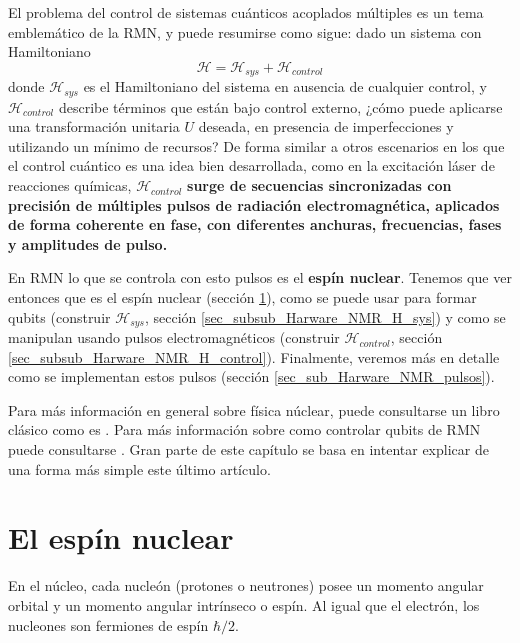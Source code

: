 El problema del control de sistemas cuánticos acoplados múltiples es un tema emblemático de la RMN, y puede resumirse como sigue: dado un sistema con Hamiltoniano
\begin{equation}
\mathcal{H} = \mathcal{H}_{sys} + \mathcal{H}_{control}
\end{equation}
donde $\mathcal{H}_{sys}$ es el Hamiltoniano del sistema en ausencia de cualquier control, y $\mathcal{H}_{control}$ describe términos que están bajo control externo, ¿cómo puede aplicarse una transformación unitaria $U$ deseada, en presencia de imperfecciones y utilizando un mínimo de recursos? De forma similar a otros escenarios en los que el control cuántico es una idea bien desarrollada, como en la excitación láser de reacciones químicas, $\mathcal{H}_{control}$ \textbf{surge de secuencias sincronizadas con precisión de múltiples pulsos de radiación electromagnética, aplicados de forma coherente en fase, con diferentes anchuras, frecuencias, fases y amplitudes de pulso.}

En RMN lo que se controla con esto pulsos es el \textbf{espín nuclear}. Tenemos que ver entonces que es el espín nuclear (sección \ref{sec_sub_Harware_NMR_espin}), como se puede usar para formar qubits (construir $\mathcal{H}_{sys}$, sección \ref{sec_subsub_Harware_NMR_H_sys}) y como se  manipulan usando pulsos electromagnéticos (construir $\mathcal{H}_{control}$, sección \ref{sec_subsub_Harware_NMR_H_control}). Finalmente, veremos más en detalle como se implementan estos pulsos (sección \ref{sec_sub_Harware_NMR_pulsos}).

Para más información en general sobre física núclear, puede consultarse un libro clásico como es \cite{bib_Krane:359790}. Para más información sobre como controlar qubits de RMN puede consultarse \cite{bib_NMR_hardware}. Gran parte de este capítulo se basa en intentar explicar de una forma más simple este último artículo.



		\section{El espín nuclear} \label{sec_sub_Harware_NMR_espin}

En el núcleo, cada nucleón (protones o neutrones) posee un momento angular orbital y un momento angular intrínseco o espín. Al igual que el electrón, los nucleones son fermiones de espín $\hbar/2$. 


